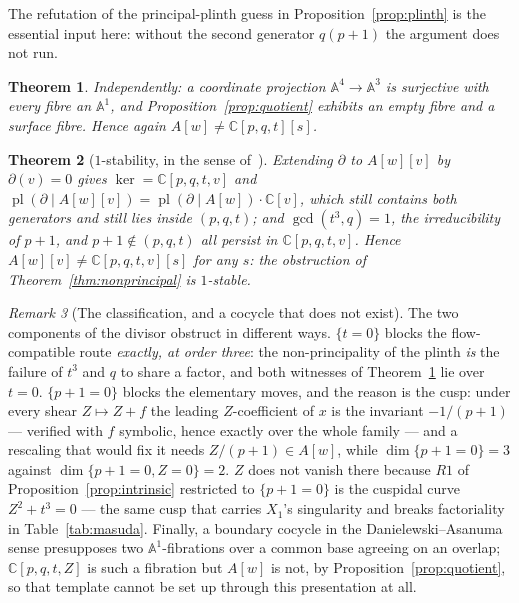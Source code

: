 \documentclass[11pt]{article}
\newtheorem{theorem}{Theorem}[section]
\theoremstyle{definition}
\theoremstyle{remark}
\newtheorem{remark}[theorem]{Remark}
\newcommand{\C}{\mathbb{C}}
\newcommand{\Aff}[1]{\mathbb{A}^{#1}}
\newcommand{\pl}{\operatorname{pl}}
\begin{document}
The refutation of the principal-plinth guess in Proposition~\ref{prop:plinth}
is the essential input here: without the second generator $q(p+1)$ the
argument does not run.

\begin{theorem}\label{thm:nonprincipal2}
Independently: a coordinate projection $\Aff{4}\to\Aff{3}$ is surjective with
every fibre an $\Aff{1}$, and Proposition~\ref{prop:quotient} exhibits an
empty fibre and a surface fibre. Hence again $A[w]\ne\C[p,q,t][s]$.
\end{theorem}

\begin{theorem}[$1$-stability, in the sense of~\cite{Lewis2013}]\label{thm:stable}
Extending $\partial$ to $A[w][v]$ by $\partial(v)=0$ gives
$\ker=\C[p,q,t,v]$ and $\pl(\partial\mid A[w][v])=\pl(\partial\mid
A[w])\cdot\C[v]$, which still contains both generators and still lies inside
$(p,q,t)$; and $\gcd(t^3,q)=1$, the irreducibility of $p+1$, and
$p+1\notin(p,q,t)$ all persist in $\C[p,q,t,v]$. Hence
$A[w][v]\ne\C[p,q,t,v][s]$ for any $s$: the obstruction of
Theorem~\ref{thm:nonprincipal} is $1$-stable.
\end{theorem}

\begin{remark}[The classification, and a cocycle that does not
exist]\label{rem:classification}
The two components of the divisor obstruct in different ways.
$\{t=0\}$ blocks the flow-compatible route \emph{exactly, at order three}: the
non-principality of the plinth \emph{is} the failure of $t^3$ and $q$ to share
a factor, and both witnesses of Theorem~\ref{thm:nonprincipal2} lie over
$t=0$. $\{p+1=0\}$ blocks the elementary moves, and the reason is the cusp:
under every shear $Z\mapsto Z+f$ the leading $Z$-coefficient of $x$ is the
invariant $-1/(p+1)$ --- verified with $f$ symbolic, hence exactly over the
whole family --- and a rescaling that would fix it needs $Z/(p+1)\in A[w]$,
while $\dim\{p+1=0\}=3$ against $\dim\{p+1=0,Z=0\}=2$. $Z$ does not vanish
there because $R1$ of Proposition~\ref{prop:intrinsic} restricted to
$\{p+1=0\}$ is the cuspidal curve $Z^2+t^3=0$ --- the same cusp that carries
$X_1$'s singularity and breaks factoriality in
Table~\ref{tab:masuda}. Finally, a boundary cocycle in the
Danielewski--Asanuma sense presupposes two $\Aff{1}$-fibrations over a common
base agreeing on an overlap; $\C[p,q,t,Z]$ is such a fibration but $A[w]$ is
not, by Proposition~\ref{prop:quotient}, so that template cannot be set up
through this presentation at all.
\end{remark}
\end{document}
